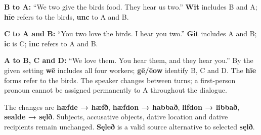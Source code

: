 \par\begin{minipage}{\linewidth}\raggedright

\textbf{B to A:} “We two give the birds food. They hear us two.” \textbf{Wit} includes B and A; \textbf{hīe} refers to the birds, \textbf{unc} to A and B.

\textbf{C to A and B:} “You two love the birds. I hear you two.” \textbf{Git} includes A and B; \textbf{ic} is C; \textbf{inc} refers to A and B.

\textbf{A to B, C and D:} “We love them. You hear them, and they hear you.” By the given setting \textbf{wē} includes all four workers; \textbf{gē/\allowbreak{}ēow} identify B, C and D. The \textbf{hīe} forms refer to the birds. The speaker changes between turns; a first-person pronoun cannot be assigned permanently to A throughout the dialogue.

\end{minipage}\par\addvspace{4pt}

\par\begin{minipage}{\linewidth}\raggedright

\end{minipage}\par\addvspace{4pt}

\par\begin{minipage}{\linewidth}\raggedright

The changes are \textbf{hæfde → hæfð}, \textbf{hæfdon → habbað}, \textbf{lifdon → libbað}, \textbf{sealde → sęlð}. Subjects, accusative objects, dative location and dative recipients remain unchanged. \textbf{Sęleð} is a valid source alternative to selected \textbf{sęlð}.

\end{minipage}\par\addvspace{4pt}

